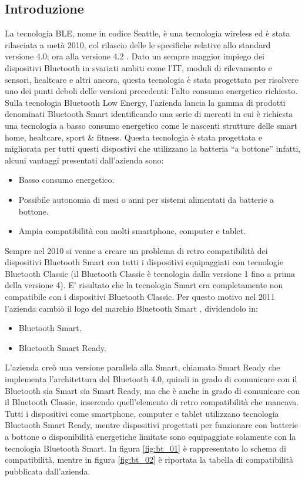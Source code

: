  \subsection{Introduzione}
La tecnologia \acf{BLE}, nome in codice Seattle, è una tecnologia wireless ed è stata rilasciata a metà 2010, col rilascio delle le specifiche relative allo standard versione 4.0; ora alla versione 4.2 \cite{BT-CoreSpec4.0} . Dato un sempre maggior impiego dei dispositivi Bluetooth in svariati ambiti come l’IT, moduli di rilevamento e sensori, healtcare \cite{BT-SmartMarks} e altri ancora, questa tecnologia è stata progettata per risolvere uno dei punti deboli delle versioni precedenti: l’alto consumo energetico richiesto. Sulla tecnologia Bluetooth Low Energy, l'azienda lancia la gamma di prodotti denominati Bluetooth Smart identificando una serie di mercati in cui è richiesta una tecnologia a basso consumo energetico come le nascenti strutture delle smart home, healtcare, sport \& fitness. Questa tecnologia è stata progettata e migliorata per tutti questi dispostivi che utilizzano la batteria “a bottone” infatti, alcuni vantaggi presentati dall'azienda sono:
\begin{itemize}
	\item Basso consumo energetico.
	\item Possibile autonomia di mesi o anni per sistemi alimentati da batterie a bottone.
	\item Ampia compatibilità con molti smartphone, computer e tablet.
\end{itemize}
 Sempre nel 2010 si venne a creare un problema di retro compatibilità dei dispositivi Bluetooth Smart con tutti i dispositivi equipaggiati con tecnologie Bluetooth Classic (il Bluetooth Classic è tecnologia dalla versione 1 fino a prima della versione 4). E’ risultato che la tecnologia Smart era completamente non compatibile con i dispositivi Bluetooth Classic. Per questo motivo nel 2011 l’azienda cambiò il logo del marchio Bluetooth Smart \cite{BT-Brand}, dividendolo in:
 \begin{itemize}
 	\item Bluetooth Smart.
 	\item Bluetooth Smart Ready.
 \end{itemize}
 L’azienda creò una versione parallela alla Smart, chiamata Smart Ready che implementa l’architettura del Bluetooth 4.0, quindi in grado di comunicare con il Bluetooth sia Smart sia Smart Ready, ma che è anche in grado di comunicare con il Bluetooth Classic, inserendo quell’elemento di retro compatibilità che mancava. Tutti i dispositivi come smartphone, computer e tablet utilizzano tecnologia Bluetooth Smart Ready, mentre dispositivi progettati per funzionare con batterie a bottone o disponibilità energetiche limitate sono equipaggiate solamente con la tecnologia Bluetooth Smart. In figura \ref{fig:bt_01} è rappresentato lo schema di compatibilità, mentre in figura \ref{fig:bt_02} è riportata la tabella di compatibilità pubblicata dall’azienda. 
 
